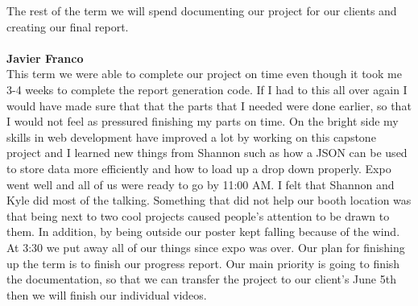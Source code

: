 \documentclass[../final.tex]{subfiles}
\begin{document}
The rest of the term we will spend documenting our project for our clients and creating our final report. \\ \\
\textbf{Javier Franco}\\
This term we were able to complete our project on time even though it took me 3-4 weeks to complete the report generation code. If I had to this all over again I would have made sure that that the parts that I needed were done earlier, so that I would not feel as pressured finishing my parts on time. On the bright side my skills in web development have improved a lot by working on this capstone project and I learned new things from Shannon such as how a JSON can be used to store data more efficiently and how to load up a drop down properly. Expo went well and all of us were ready to go by 11:00 AM. I felt that Shannon and Kyle did most of the talking. Something that did not help our booth location was that being next to two cool projects caused people's attention to be drawn to them. In addition, by being outside our poster kept falling because of the wind. At 3:30 we put away all of our things since expo was over. Our plan for finishing up the term is to finish our progress report. Our main priority is going to finish the documentation, so that we can transfer the project to our client's June 5th then we will finish our individual videos. \\
\end{document}
